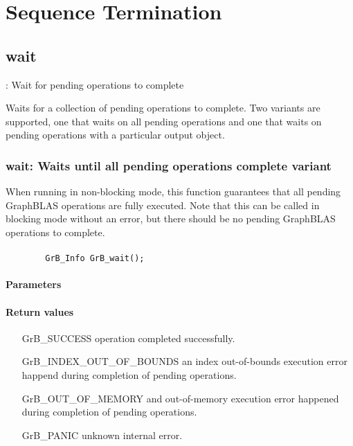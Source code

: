 \section{Sequence Termination}

\subsection{\sf wait}: Wait for pending operations to complete

Waits for a collection of pending operations to complete. Two variants are supported, one that
waits on all pending operations and one that waits on pending operations with a particular output object.

\subsubsection{{\sf wait}: Waits until all pending operations complete variant}
\label{Sec:wait}

When running in non-blocking mode, this function guarantees that all pending GraphBLAS operations are fully executed.  Note that this can be called in blocking mode without an error, but there should be no pending GraphBLAS operations to complete.

\paragraph{\syntax}

\begin{verbatim}
        GrB_Info GrB_wait();
\end{verbatim}

\paragraph{Parameters}

\paragraph{Return values}
\begin{itemize}[leftmargin=2.1in]
	\item[{\sf GrB\_SUCCESS}]	operation completed successfully.
	\item[{\sf GrB\_INDEX\_OUT\_OF\_BOUNDS}]	an index out-of-bounds execution error happend during completion of pending operations.
	\item[{\sf GrB\_OUT\_OF\_MEMORY}]		and out-of-memory execution error happened during completion of pending operations.
	\item[{\sf GrB\_PANIC}]		unknown internal error.
\end{itemize}


